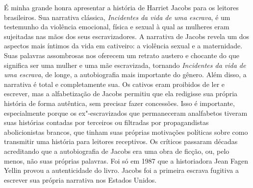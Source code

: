 É minha grande honra apresentar a história de Harriet Jacobs para os
leitores brasileiros. Sua narrativa clássica, \emph{Incidentes da vida
de uma escrava}, é um testemunho da violência emocional, física e sexual
à qual as mulheres eram sujeitadas nas mãos dos seus escravizadores. A
narrativa de Jacobs revela um dos aspectos mais íntimos da vida em
cativeiro: a violência sexual e a maternidade. Suas palavras assombrosas
nos oferecem um retrato austero e chocante do que significa ser uma
mulher e uma mãe escravizada, tornando \emph{Incidentes da vida de uma escrava},
de longe, a autobiografia mais importante do gênero. Além disso, a
narrativa é total e completamente sua. Os cativos eram proibidos de
ler e escrever, mas a alfabetização de Jacobs permitiu que ela
redigisse sua própria história de forma autêntica, sem precisar fazer
concessões. Isso é importante, especialmente porque os ex"-escravizados que
permaneceram analfabetos tiveram suas histórias contadas por terceiros
ou filtradas por propagandistas abolicionistas brancos, que tinham suas
próprias motivações políticas sobre como transmitir uma história para
leitores receptivos. Os críticos passaram décadas acreditando que a
autobiografia de Jacobs era uma obra de ficção, ou, pelo menos, não suas
próprias palavras. Foi só em 1987 que a historiadora Jean Fagen Yellin
provou a autenticidade do livro. Jacobs foi a primeira escrava fugitiva
a escrever sua própria narrativa nos Estados Unidos.
